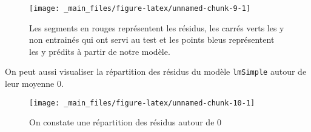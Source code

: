 \documentclass[
]{book}
\newenvironment{Shaded}{\begin{snugshade}}{\end{snugshade}}
\newcommand{\FunctionTok}[1]{\textcolor[rgb]{0.00,0.00,0.00}{#1}}
\newcommand{\NormalTok}[1]{#1}
\newcommand{\SpecialCharTok}[1]{\textcolor[rgb]{0.00,0.00,0.00}{#1}}
\begin{document}
\begin{figure}

{\centering \texttt{[image: \_main\_files/figure-latex/unnamed-chunk-9-1]} 

}

\caption{Les segments en rouges représentent les résidus, les carrés verts les y non entrainés qui ont servi au test et les points bleus représentent les y prédits à partir de notre modèle.}\label{fig:unnamed-chunk-9}
\end{figure}

On peut aussi visualiser la répartition des résidus du modèle \texttt{lmSimple} autour de leur moyenne \(0\).\\

\begin{Shaded}
\end{Shaded}

\begin{figure}

{\centering \texttt{[image: \_main\_files/figure-latex/unnamed-chunk-10-1]} 

}

\caption{On constate une répartition des résidus autour de 0}\label{fig:unnamed-chunk-10}
\end{figure}

  
\end{document}
